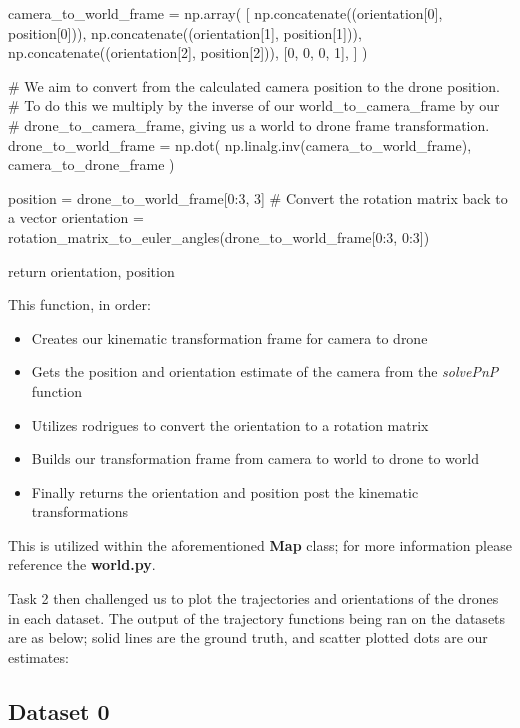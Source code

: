 \documentclass{article}
\begin{document}
\begin{python}
    camera_to_world_frame = np.array(
    [
            np.concatenate((orientation[0], position[0])),
            np.concatenate((orientation[1], position[1])),
            np.concatenate((orientation[2], position[2])),
            [0, 0, 0, 1],
        ]
    )

    # We aim to convert from the calculated camera position to the drone position.
    # To do this we multiply by the inverse of our world_to_camera_frame by our
    # drone_to_camera_frame, giving us a world to drone frame transformation.
    drone_to_world_frame = np.dot(
    np.linalg.inv(camera_to_world_frame), camera_to_drone_frame
    )

    position = drone_to_world_frame[0:3, 3]
    # Convert the rotation matrix back to a vector
    orientation = rotation_matrix_to_euler_angles(drone_to_world_frame[0:3, 0:3])

    return orientation, position
\end{python}

This function, in order:

\begin{itemize}
    \item Creates our kinematic transformation frame for camera to drone
    \item Gets the position and orientation estimate of the camera from the \textit{solvePnP} function
    \item Utilizes rodrigues to convert the orientation to a rotation matrix
    \item Builds our transformation frame from camera to world to drone to world
    \item Finally returns the orientation and position post the kinematic transformations
\end{itemize}

This is utilized within the aforementioned \textbf{Map} class; for more information please reference the \textbf{world.py}.

Task 2 then challenged us to plot the trajectories and orientations of the drones in each dataset. The output of the trajectory functions being ran on the datasets are as below; solid lines are the ground truth, and scatter plotted dots are our estimates:

\subsection*{Dataset 0}
\end{document}
